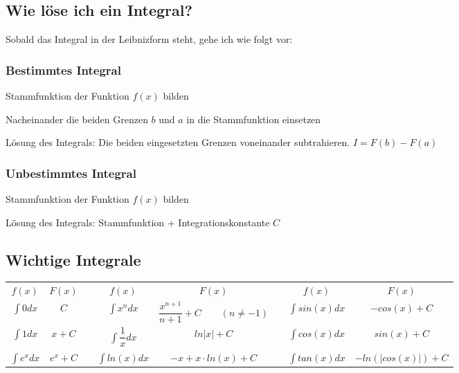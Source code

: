 \subsection{Wie löse ich ein Integral?}
Sobald das Integral in der Leibnizform steht, gehe ich wie folgt vor:
\subsubsection{Bestimmtes Integral}
\begin{compactenum}
	\item Stammfunktion der Funktion $f(x)$ bilden
	\item Nacheinander die beiden Grenzen $b$ und $a$ in die Stammfunktion einsetzen
	\item Lösung des Integrals: Die beiden eingesetzten Grenzen voneinander subtrahieren. $I=F(b)-F(a)$
\end{compactenum}
\subsubsection{Unbestimmtes Integral}
\begin{compactenum}
	\item Stammfunktion der Funktion $f(x)$ bilden
	\item Lösung des Integrals: Stammfunktion + Integrationskonstante $C$
\end{compactenum}

\subsection{Wichtige Integrale}
\renewcommand{\arraystretch}{2.0}
\begin{tabular}{|c|c|c|c|c|c|c|c|}
	\cline{1-2}\cline{4-5}\cline{7-8}
	\boldmath${f(x)}$ & \boldmath${F(x)}$ &\qquad\qquad\qquad& \boldmath${f(x)}$ & \boldmath${F(x)}$ &\qquad\qquad\qquad& \boldmath${f(x)}$ & \boldmath${F(x)}$\\
	\cline{1-2}\cline{4-5}\cline{7-8}
	$\displaystyle \int{0}dx$ & $C$ && $\displaystyle \int{x^n}d{x}$ & $\dfrac{x^{n+1}}{n+1}+C \qquad (n\ne-1)$ && $\displaystyle \int{sin(x)}dx$ & $-cos(x)+C$\\
	\cline{1-2}\cline{4-5}\cline{7-8}
	$\displaystyle \int{1}dx$ & $x+C$ && $\displaystyle \int{\dfrac{1}{x}}dx$ & $ln|x|+C$ && $\displaystyle \int{cos(x)}dx$ & $sin(x)+C$\\
	\cline{1-2}\cline{4-5}\cline{7-8}
	$\displaystyle \int{e^x}dx$ & $e^x+C$ && $\displaystyle \int{ln(x)}dx$ & $-x+x\cdot ln(x)+C$ && $\displaystyle \int{tan(x)}dx$ & $-ln(|cos(x)|)+C$\\
	\cline{1-2}\cline{4-5}\cline{7-8}
\end{tabular}

